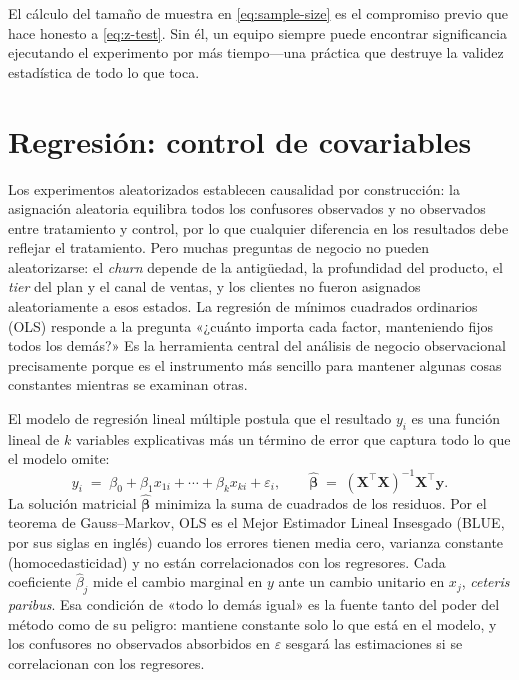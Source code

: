 El cálculo del tamaño de muestra en \cref{eq:sample-size} es el compromiso previo que hace
honesto a \cref{eq:z-test}. Sin él, un equipo siempre puede encontrar significancia ejecutando
el experimento por más tiempo---una práctica que destruye la validez estadística de todo lo
que toca.


\section{Regresión: control de covariables}\label{sec:regression}

Los experimentos aleatorizados establecen causalidad por construcción: la asignación aleatoria
equilibra todos los confusores observados y no observados entre tratamiento y control, por lo
que cualquier diferencia en los resultados debe reflejar el tratamiento. Pero muchas preguntas
de negocio no pueden aleatorizarse: el \emph{churn} depende de la antigüedad, la profundidad
del producto, el \emph{tier} del plan y el canal de ventas, y los clientes no fueron asignados
aleatoriamente a esos estados. La regresión de mínimos cuadrados ordinarios (OLS) responde a
la pregunta «¿cuánto importa cada factor, manteniendo fijos todos los demás?» Es la herramienta
central del análisis de negocio observacional precisamente porque es el instrumento más sencillo
para mantener algunas cosas constantes mientras se examinan otras.

El modelo de regresión lineal múltiple postula que el resultado \(y_i\) es una función lineal
de \(k\) variables explicativas más un término de error que captura todo lo que el modelo
omite:
\begin{equation}\label{eq:ols}
  y_i \;=\; \beta_0 + \beta_1 x_{1i} + \cdots + \beta_k x_{ki} + \varepsilon_i,
  \qquad
  \hat{\boldsymbol{\beta}} \;=\; (\mathbf{X}^{\!\top}\mathbf{X})^{-1}\mathbf{X}^{\!\top}\mathbf{y}.
\end{equation}
La solución matricial \(\hat{\boldsymbol{\beta}}\) minimiza la suma de cuadrados de los
residuos. Por el teorema de Gauss--Markov, OLS es el Mejor Estimador Lineal Insesgado (BLUE,
por sus siglas en inglés) cuando los errores tienen media cero, varianza constante
(homocedasticidad) y no están correlacionados con los regresores. Cada coeficiente
\(\hat{\beta}_j\) mide el cambio marginal en \(y\) ante un cambio unitario en \(x_j\),
\emph{ceteris paribus}. Esa condición de «todo lo demás igual» es la fuente tanto del poder
del método como de su peligro: mantiene constante solo lo que está en el modelo, y los
confusores no observados absorbidos en \(\varepsilon\) sesgará las estimaciones si se
correlacionan con los regresores.

